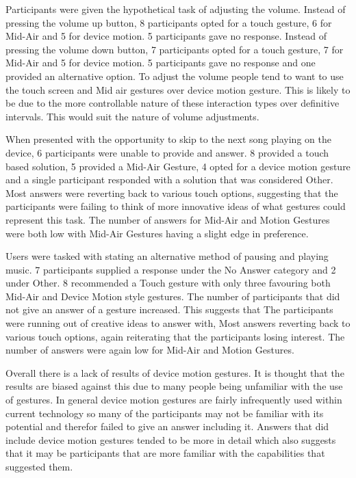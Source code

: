 \documentclass{l4proj}
\begin{document}
Participants were given the hypothetical task of adjusting the volume. Instead of pressing the volume up button, 8 participants opted for a touch gesture, 6 for Mid-Air and 5 for device motion. 5 participants gave no response. Instead of pressing the volume down button, 7 participants opted for a touch gesture, 7 for Mid-Air and 5 for device motion. 5 participants gave no response and one provided an alternative option. To adjust the volume people tend to want to use the touch screen and Mid air gestures over device motion gesture. This is likely to be due to the more controllable nature of these interaction types over definitive intervals. This would suit the nature of volume adjustments.

When presented with the opportunity to skip to the next song playing on the device, 6 participants were unable to provide and answer. 8 provided a touch based solution, 5 provided a Mid-Air Gesture, 4 opted for a device motion gesture and a single participant responded with a solution that was considered Other. Most answers were reverting back to various touch options, suggesting that the participants were failing to think of more innovative ideas of what gestures could represent this task. The number of answers for Mid-Air and Motion Gestures were both low with Mid-Air Gestures having a slight edge in preference.

Users were tasked with stating an alternative method of pausing and playing music. 7 participants supplied a response under the No Answer category and 2 under Other. 8 recommended a Touch gesture with only three favouring both Mid-Air and Device Motion style gestures. The number of participants that did not give an answer of a gesture increased. This suggests that The participants were running out of creative ideas to answer with, Most answers reverting back to various touch options, again reiterating that the participants losing interest. The number of answers were again low for Mid-Air and Motion Gestures.

Overall there is a lack of results of device motion gestures. It is thought that the results are biased against this due to many people being unfamiliar with the use of gestures. In general device motion gestures are fairly infrequently used within current technology so many of the participants may not be familiar with its potential and therefor failed to give an answer including it. Answers that did include device motion gestures tended to be more in detail which also suggests that it may be participants that are more familiar with the capabilities that suggested them.
\end{document}
